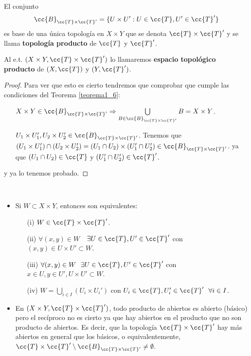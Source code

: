 \begin{prop}
    El conjunto 
    \begin{align*}
        \cc{B}_{\cc{T}\times \cc{T}'}=\{U\times U' : U\in \cc{T}, U'\in \cc{T}'\}
    \end{align*} 
    es base de una única topología en $X\times Y$ que se denota $\cc{T}\times \cc{T}'$ y se llama \textbf{topología producto} de $\cc{T}$ y $\cc{T}'$. 

    Al e.t. $(X\times Y, \cc{T}\times \cc{T}')$ lo llamaremos \textbf{espacio topológico producto} de $(X, \cc{T})$ y $(Y, \cc{T}')$.

    \begin{proof} Para ver que esto es cierto tendremos que comprobar que cumple las condiciones del Teorema \ref{teorema1_6}:
        \begin{enumerate}
            \item[\apuntar{B1}] $X\times Y \in \cc{B}_{\cc{T}\times \cc{T}'}\Rightarrow \bigcup\limits_{B\in \cc{B}_{\cc{T}\times \cc{T}'}}B=X\times Y$.
            \item[\apuntar{B2}] $U_1\times U_1', U_2\times U_2'\in \cc{B}_{\cc{T}\times \cc{T}'}$. Tenemos que $(U_1\times U_1')\cap (U_2\times U_2') = (U_1\cap U_2)\times (U_1'\cap U_2')\in \cc{B}_{\cc{T}\times \cc{T}'}$. ya que $(U_1\cap U_2)\in \cc{T}$ y $(U_1'\cap U_2')\in \cc{T}'$.
        \end{enumerate}
        y ya lo tenemos probado.

    \end{proof}
\end{prop}

\begin{observacion}\
    \begin{itemize}
        \item Si $W\subset X\times Y$, entonces son equivalentes:
        \begin{enumerate}
            \item[(i)] $W\in \cc{T}\times \cc{T}'$.
            \item[(ii)] $\forall (x,y)\in W$\ \ $\exists U\in \cc{T}, U'\in \cc{T}'$ con $(x,y)\in U\times U'\subset W$.
            \item[(iii)] $\forall (x,y)\in W\ \ \exists U\in \cc{T}, U'\in \cc{T}'$ con $x\in U, y \in U', U\times U'\subset W$.
            \item[(iv)] $W=\bigcup\limits_{i\in I}(U_i\times U_i')$ con $U_i\in \cc{T}, U_i'\in \cc{T}'\ \ \forall i\in I$.
        \end{enumerate}
        \item En $(X\times Y, \cc{T}\times \cc{T}')$, todo producto de abiertos es abierto (básico) pero el recíproco no es cierto ya que hay abiertos en el producto que no son producto de abiertos. Es decir, que la topología $\cc{T}\times \cc{T}'$ hay más abiertos en general que los básicos, o equivalentemente, $\cc{T}\times \cc{T}'\setminus \cc{B}_{\cc{T}\times \cc{T}'}\neq \emptyset$.
    \end{itemize}
\end{observacion}

